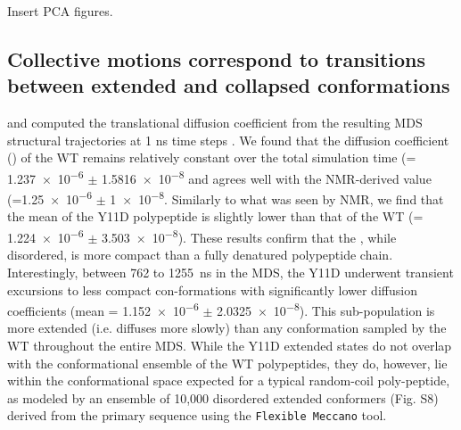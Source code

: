 

Insert PCA figures.


\subsection{Collective motions correspond to transitions between extended and collapsed conformations}



 and computed the translational diffusion coefficient from the resulting MDS structural trajectories at 1 ns time steps . We found that the diffusion coefficient (\diffusion) of the WT \gct{} remains relatively constant over the total simulation time (\diffusion = \num{1.237e-6} $\pm$ \SI{1.5816e-8}{\dcunits} and agrees well with the NMR-derived value (\diffusion=\num{1.25e-6} $\pm$  \SI{1e-8}{\dcunits}.  Similarly to what was seen by NMR, we find that the mean \diffusion of the Y11D \gct{} polypeptide is slightly lower than that of the WT \gct{} (\diffusion= \num{1.224e-6} $\pm$ \SI{3.503e-8}{\dcunits}). These results confirm that the \gct{}, while disordered, is more compact than a fully denatured polypeptide chain. Interestingly, between \num{762} to \SI{1255}{\ns} in the MDS, the Y11D \gct{} underwent transient excursions to less compact con-formations with significantly lower diffusion coefficients (mean \diffusion{}= \num{1.152e-6} $\pm$ \SI{2.0325e-8}{\dcunits}). This sub-population is more extended (i.e. diffuses more slowly) than any conformation sampled by the WT \gct{} throughout the entire MDS. While the Y11D \gct{} extended states do not overlap with the conformational ensemble of the WT \gct{} polypeptides, they do, however, lie within the conformational space expected for a typical random-coil poly-peptide, as modeled by an ensemble of 10,000 disordered extended conformers (Fig. S8) derived from the \gct{} primary sequence using the \texttt{Flexible Meccano} tool.  

